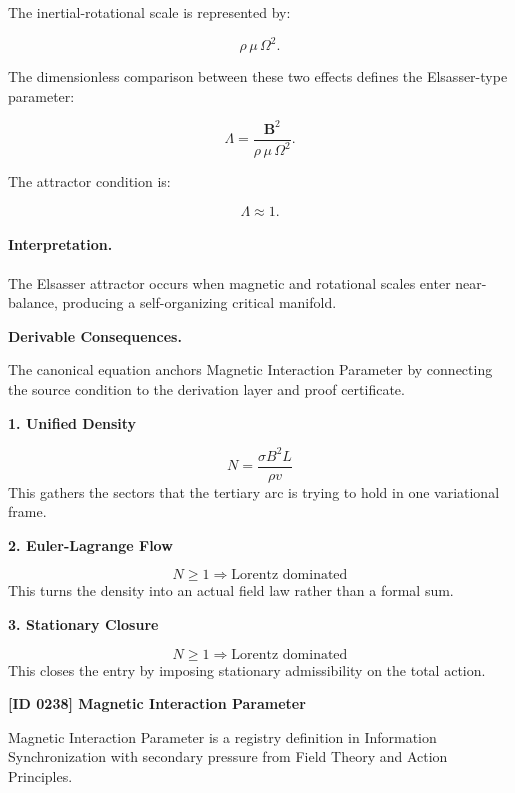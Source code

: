The inertial-rotational scale is represented by:

\begin{equation}
\rho\,\mu\,\Omega^2 .
\end{equation}

The dimensionless comparison between these two effects defines the Elsasser-type parameter:

\begin{equation}
\boxed{
\Lambda
=
\frac{\mathbf{B}^2}
{\rho\,\mu\,\Omega^2}.
}
\end{equation}

The attractor condition is:

\begin{equation}
\Lambda \approx 1 .
\end{equation}

\paragraph{Interpretation.}
The Elsasser attractor occurs when magnetic and rotational scales enter near-balance, producing a self-organizing critical manifold.

\par\vspace{0.35em}
\noindent\textbf{Derivable Consequences.}\quad
\begingroup
\footnotesize
\raggedright
The canonical equation anchors Magnetic Interaction Parameter by connecting the source condition to the derivation layer and proof certificate.
\par\endgroup

\noindent\textbf{1. Unified Density}\par
\[
N=\frac{\sigma B^2L}{\rho v}
\]
\noindent This gathers the sectors that the tertiary arc is trying to hold in one variational frame.\par
\noindent\textbf{2. Euler-Lagrange Flow}\par
\[
N\geq1\Rightarrow\text{Lorentz dominated}
\]
\noindent This turns the density into an actual field law rather than a formal sum.\par
\noindent\textbf{3. Stationary Closure}\par
\[
N\geq1\Rightarrow\text{Lorentz dominated}
\]
\noindent This closes the entry by imposing stationary admissibility on the total action.\par

\clearpage
\noindent\textbf{[ID 0238] Magnetic Interaction Parameter}\par
\vspace{0.35em}
\begingroup\small
{}
Magnetic Interaction Parameter is a registry definition in Information Synchronization with secondary pressure from Field Theory and Action Principles.

